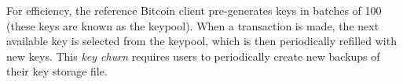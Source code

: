 For efficiency, the reference Bitcoin client pre-generates keys in batches of 100 (these keys are known as the keypool). When a transaction is made, the next available key is selected from the keypool, which is then periodically refilled with new keys. This \emph{key churn} requires users to periodically create new backups of their key storage file. 





